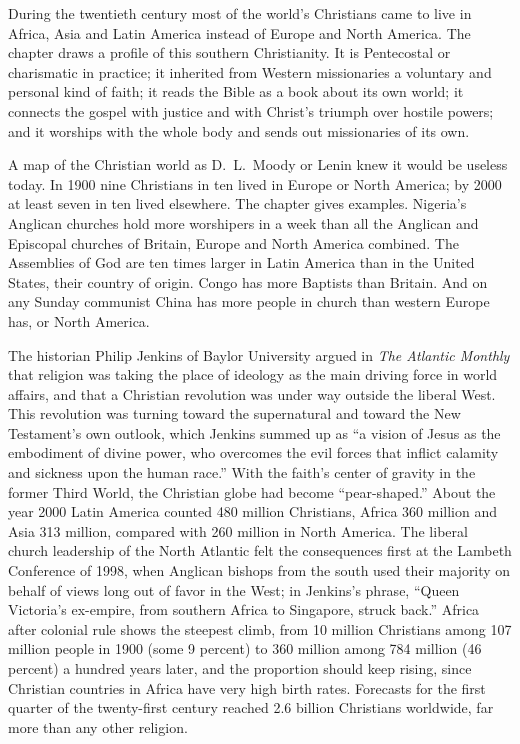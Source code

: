 
\begin{inbrief}
During the twentieth century most of the world's Christians came to live in Africa, Asia and Latin
America instead of Europe and North America. The chapter draws a profile of this southern
Christianity. It is Pentecostal or charismatic in practice; it inherited from Western missionaries a
voluntary and personal kind of faith; it reads the Bible as a book about its own world; it connects
the gospel with justice and with Christ's triumph over hostile powers; and it worships with the whole
body and sends out missionaries of its own.
\end{inbrief}

A map of the Christian world as D.~L.~Moody or Lenin knew it would be useless today. In 1900 nine
Christians in ten lived in Europe or North America; by 2000 at least seven in ten lived elsewhere.
The chapter gives examples. Nigeria's Anglican churches hold more worshipers in a week than all the
Anglican and Episcopal churches of Britain, Europe and North America combined. The Assemblies of God
are ten times larger in Latin America than in the United States, their country of origin. Congo has
more Baptists than Britain. And on any Sunday communist China has more people in church than western
Europe has, or North America.

The historian Philip Jenkins of Baylor University argued in \emph{The Atlantic Monthly} that religion
was taking the place of ideology as the main driving force in world affairs, and that a Christian
revolution was under way outside the liberal West. This revolution was turning toward the
supernatural and toward the New Testament's own outlook, which Jenkins summed up as ``a vision of
Jesus as the embodiment of divine power, who overcomes the evil forces that inflict calamity and
sickness upon the human race.'' With the faith's center of gravity in the former Third World, the
Christian globe had become ``pear-shaped.'' About the year 2000 Latin America counted 480 million
Christians, Africa 360 million and Asia 313 million, compared with 260 million in North America. The
liberal church leadership of the North Atlantic felt the consequences first at the Lambeth Conference
of 1998, when Anglican bishops from the south used their majority on behalf of views long out of
favor in the West; in Jenkins's phrase, ``Queen Victoria's ex-empire, from southern Africa to
Singapore, struck back.'' Africa after colonial rule shows the steepest climb, from 10 million
Christians among 107 million people in 1900 (some 9 percent) to 360 million among 784 million (46
percent) a hundred years later, and the proportion should keep rising, since Christian countries in
Africa have very high birth rates. Forecasts for the first quarter of the twenty-first century
reached 2.6 billion Christians worldwide, far more than any other religion.

